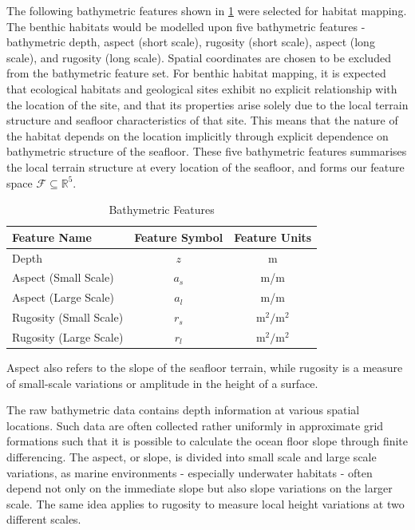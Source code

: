 		The following bathymetric features shown in \cref{Table:BathymetricFeatures} were selected for habitat mapping. The benthic habitats would be modelled upon five bathymetric features - bathymetric depth, aspect (short scale), rugosity (short scale), aspect (long scale), and rugosity (long scale). Spatial coordinates are chosen to be excluded from the bathymetric feature set. For benthic habitat mapping, it is expected that ecological habitats and geological sites exhibit no explicit relationship with the location of the site, and that its properties arise solely due to the local terrain structure and seafloor characteristics  of that site. This means that the nature of the habitat depends on the location implicitly through explicit dependence on bathymetric structure of the seafloor. These five bathymetric features summarises the local terrain structure at every location of the seafloor, and forms our feature space $\mathcal{F} \subseteq \mathbb{R}^{5}$.
		
		\begin{table}[h]
			\begin{center}
				\begin{tabular}{ l c c }
					\hline
					\hline
					Feature Name & Feature Symbol & Feature Units \\
					\hline
					\hline
					Depth & $z$ & m \\
					Aspect (Small Scale) & $a_{s}$ & m/m \\
					Aspect (Large Scale) & $a_{l}$& m/m \\
					Rugosity (Small Scale) & $r_{s}$ & $\mathrm{m^{2}/m^{2}}$ \\
					Rugosity (Large Scale) & $r_{l}$ & $\mathrm{m^{2}/m^{2}}$  \\
					\hline
					\hline
				\end{tabular}
			\end{center}
	  	\caption{Bathymetric Features}
	  	\label{Table:BathymetricFeatures}			
	  	\end{table}	
		
		Aspect also refers to the slope of the seafloor terrain, while rugosity is a measure of small-scale variations or amplitude in the height of a surface.
		
		The raw bathymetric data contains depth information at various spatial locations. Such data are often collected rather uniformly in approximate grid formations such that it is possible to calculate the ocean floor slope through finite differencing. The aspect, or slope, is divided into small scale and large scale variations, as marine environments - especially underwater habitats - often depend not only on the immediate slope but also slope variations on the larger scale. The same idea applies to rugosity to measure local height variations at two different scales.
		
